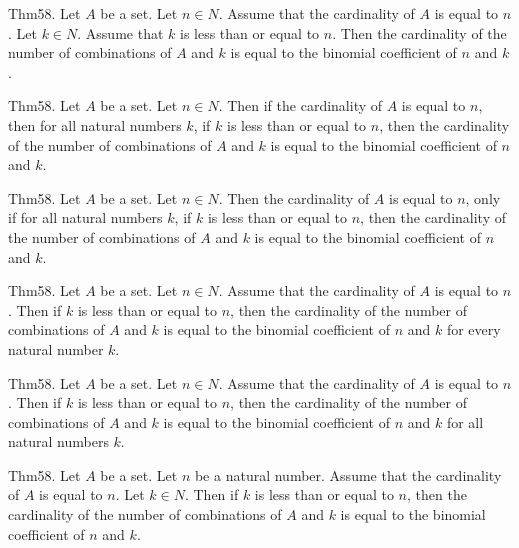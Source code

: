 \documentclass{article}
\begin{document}
Thm58. Let $A$ be a set. Let $n \in N$. Assume that the cardinality of $A$ is equal to $n$. Let $k \in N$. Assume that $k$ is less than or equal to $n$. Then the cardinality of the number of combinations of $A$ and $k$ is equal to the binomial coefficient of $n$ and $k$.

Thm58. Let $A$ be a set. Let $n \in N$. Then if the cardinality of $A$ is equal to $n$, then for all natural numbers $k$, if $k$ is less than or equal to $n$, then the cardinality of the number of combinations of $A$ and $k$ is equal to the binomial coefficient of $n$ and $k$.

Thm58. Let $A$ be a set. Let $n \in N$. Then the cardinality of $A$ is equal to $n$, only if for all natural numbers $k$, if $k$ is less than or equal to $n$, then the cardinality of the number of combinations of $A$ and $k$ is equal to the binomial coefficient of $n$ and $k$.

Thm58. Let $A$ be a set. Let $n \in N$. Assume that the cardinality of $A$ is equal to $n$. Then if $k$ is less than or equal to $n$, then the cardinality of the number of combinations of $A$ and $k$ is equal to the binomial coefficient of $n$ and $k$ for every natural number $k$.

Thm58. Let $A$ be a set. Let $n \in N$. Assume that the cardinality of $A$ is equal to $n$. Then if $k$ is less than or equal to $n$, then the cardinality of the number of combinations of $A$ and $k$ is equal to the binomial coefficient of $n$ and $k$ for all natural numbers $k$.

Thm58. Let $A$ be a set. Let $n$ be a natural number. Assume that the cardinality of $A$ is equal to $n$. Let $k \in N$. Then if $k$ is less than or equal to $n$, then the cardinality of the number of combinations of $A$ and $k$ is equal to the binomial coefficient of $n$ and $k$.
\end{document}
